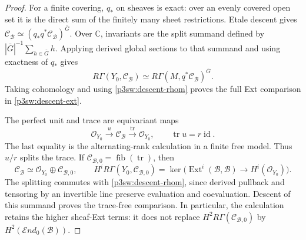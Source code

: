 \documentclass[11pt]{article}
\newcommand{\C}{\mathbb C}
\numberwithin{equation}{section}
\begin{document}
\begin{proof}
For a finite covering, \(q_*\) on sheaves is exact: over an evenly
covered open set it is the direct sum of the finitely many sheet
restrictions.  Etale descent gives
\(\mathcal C_{\mathcal B}\simeq(q_*q^*\mathcal C_{\mathcal B})^{\bar G}\).
Over \(\C\), invariants are the split summand defined by
\(|\bar G|^{-1}\sum_{h\in\bar G}h\).  Applying derived global sections
to that summand and using exactness of \(q_*\) gives
\[
 R\Gamma(Y_0,\mathcal C_{\mathcal B})
   \simeq R\Gamma(M,q^*\mathcal C_{\mathcal B})^{\bar G}.
\]
Taking cohomology and using \eqref{p3sw:descent-rhom} proves the full
Ext comparison in \eqref{p3sw:descent-ext}.

The perfect unit and trace are equivariant maps
\begin{equation}
\label{p3sw:descent-trace}
 \mathcal O_{Y_0}\xrightarrow{u}\mathcal C_{\mathcal B}
       \xrightarrow{\operatorname{tr}}\mathcal O_{Y_0},
 \qquad \operatorname{tr}u=r\operatorname{id}.
\end{equation}
The last equality is the alternating-rank calculation in a finite free
model.  Thus \(u/r\) splits the trace.  If
\(\mathcal C_{\mathcal B,0}=\operatorname{fib}(\operatorname{tr})\),
then
\[
 \mathcal C_{\mathcal B}\simeq
 \mathcal O_{Y_0}\oplus\mathcal C_{\mathcal B,0},\qquad
 H^iR\Gamma(Y_0,\mathcal C_{\mathcal B,0})
 =\ker\bigl(\operatorname{Ext}^i(\mathcal B,\mathcal B)
                   \to H^i(\mathcal O_{Y_0})\bigr).
\]
The splitting commutes with \eqref{p3sw:descent-rhom}, since derived
pullback and tensoring by an invertible line preserve evaluation and
coevaluation.  Descent of this summand proves the trace-free comparison.
In particular, the calculation retains the higher sheaf-Ext terms:
it does not replace \(H^2R\Gamma(\mathcal C_{\mathcal B,0})\) by
\(H^2(\mathcal End_0(\mathcal B))\).


\end{proof}
\end{document}
